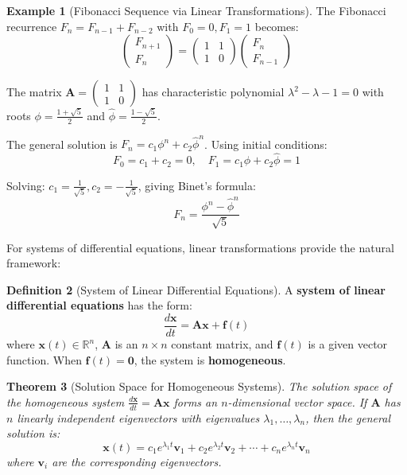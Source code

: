\documentclass[12pt]{article}
\numberwithin{equation}{section}
\newcommand{\vect}[1]{\boldsymbol{#1}}   %
\newcommand{\mat}[1]{\mathbf{#1}}        %
\theoremstyle{plain}
\newtheorem{theorem}{Theorem}[section]
\theoremstyle{definition}
\newtheorem{definition}[theorem]{Definition}
\newtheorem{example}[theorem]{Example}
\theoremstyle{remark}
\begin{document}
\begin{example}[Fibonacci Sequence via Linear Transformations]
The Fibonacci recurrence $F_n = F_{n-1} + F_{n-2}$ with $F_0 = 0, F_1 = 1$ becomes:
$$\begin{pmatrix} F_{n+1} \\ F_n \end{pmatrix} = \begin{pmatrix} 1 & 1 \\ 1 & 0 \end{pmatrix}\begin{pmatrix} F_n \\ F_{n-1} \end{pmatrix}$$

The matrix $\mat{A} = \begin{pmatrix} 1 & 1 \\ 1 & 0 \end{pmatrix}$ has characteristic polynomial $\lambda^2 - \lambda - 1 = 0$ with roots $\phi = \frac{1+\sqrt{5}}{2}$ and $\hat{\phi} = \frac{1-\sqrt{5}}{2}$.

The general solution is $F_n = c_1\phi^n + c_2\hat{\phi}^n$. Using initial conditions:
$$F_0 = c_1 + c_2 = 0, \quad F_1 = c_1\phi + c_2\hat{\phi} = 1$$

Solving: $c_1 = \frac{1}{\sqrt{5}}, c_2 = -\frac{1}{\sqrt{5}}$, giving Binet's formula:
$$F_n = \frac{\phi^n - \hat{\phi}^n}{\sqrt{5}}$$
\end{example}

For systems of differential equations, linear transformations provide the natural framework:

\begin{definition}[System of Linear Differential Equations]
A \textbf{system of linear differential equations} has the form:
$$\frac{d\vect{x}}{dt} = \mat{A}\vect{x} + \vect{f}(t)$$
where $\vect{x}(t) \in \mathbb{R}^n$, $\mat{A}$ is an $n \times n$ constant matrix, and $\vect{f}(t)$ is a given vector function. When $\vect{f}(t) = \vect{0}$, the system is \textbf{homogeneous}.
\end{definition}

\begin{theorem}[Solution Space for Homogeneous Systems]
The solution space of the homogeneous system $\frac{d\vect{x}}{dt} = \mat{A}\vect{x}$ forms an $n$-dimensional vector space. If $\mat{A}$ has $n$ linearly independent eigenvectors with eigenvalues $\lambda_1, \ldots, \lambda_n$, then the general solution is:
$$\vect{x}(t) = c_1e^{\lambda_1 t}\vect{v}_1 + c_2e^{\lambda_2 t}\vect{v}_2 + \cdots + c_ne^{\lambda_n t}\vect{v}_n$$
where $\vect{v}_i$ are the corresponding eigenvectors.
\end{theorem}
\end{document}
